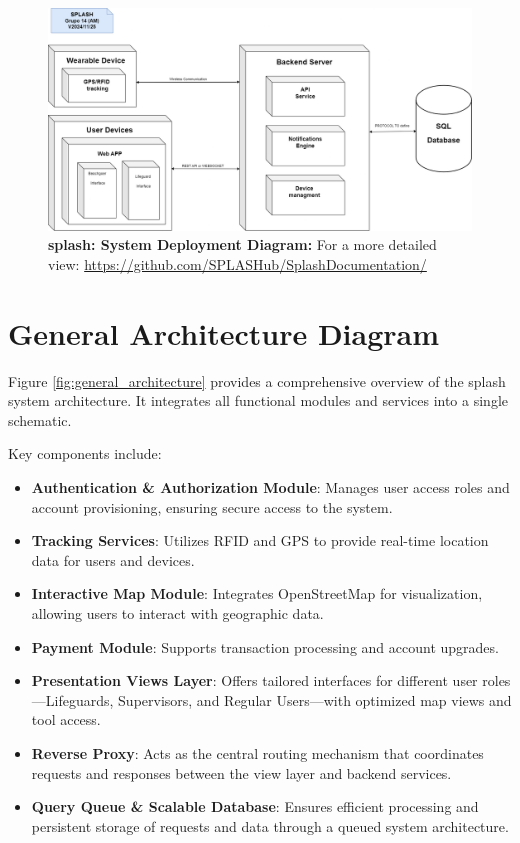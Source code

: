 \begin{figure}[H]
      \centering
      \includegraphics[width=16cm]{figs/deployment.png}
      \caption{ \textbf{ \ac{splash}: System Deployment Diagram: } For a more detailed view: \url{https://github.com/SPLASHub/SplashDocumentation/}}
      \label{fig:deployment}
\end{figure}

\newpage
\section{General Architecture Diagram}

Figure \ref{fig:general_architecture} provides a comprehensive overview of the \ac{splash} system architecture. It integrates all functional modules and services into a single schematic.

Key components include:
\begin{itemize}
    \item \textbf{Authentication \& Authorization Module}: Manages user access roles and account provisioning, ensuring secure access to the system.
    
    \item \textbf{Tracking Services}: Utilizes RFID and GPS to provide real-time location data for users and devices.
    
    \item \textbf{Interactive Map Module}: Integrates OpenStreetMap for visualization, allowing users to interact with geographic data.

    \item \textbf{Payment Module}: Supports transaction processing and account upgrades.

    \item \textbf{Presentation Views Layer}: Offers tailored interfaces for different user roles—Lifeguards, Supervisors, and Regular Users—with optimized map views and tool access.
    
    \item \textbf{Reverse Proxy}: Acts as the central routing mechanism that coordinates requests and responses between the view layer and backend services.

    \item \textbf{Query Queue \& Scalable Database}: Ensures efficient processing and persistent storage of requests and data through a queued system architecture.
\end{itemize}

